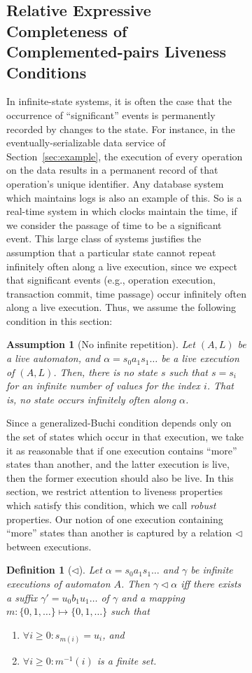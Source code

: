 \documentclass[11pt]{article}
\newcommand{\bn}{\begin{enumerate}}
\newcommand{\en}{\end{enumerate}}
\newcommand{\bd}{\begin{definition}}
\newcommand{\ed}{\end{definition}}
\newcommand{\fa}{\forall}
\newcommand{\al}{\alpha}
\newcommand{\ga}{\gamma}
\newcommand{\subs}{\lhd}		\newcommand{\suc}{\mathit{succ}}	\newcommand{\topp}{\mathit{top}}\newcommand{\trace}{\mathit{trace}}
\newtheorem{definition}{Definition}
\newtheorem{assumption}{Assumption}
\begin{document}
\begin{figure}[htb]
\begin{figure}[htb]
\subsection{Relative Expressive Completeness of Complemented-pairs
  Liveness Conditions}
\label{sec:completeness}


In infinite-state systems, it is often the case that the occurrence of
``significant'' events is permanently recorded by changes to the state.
For instance, in the eventually-serializable data service of
Section~\ref{sec:example}, the execution of every operation on the
data results
in a permanent record of that operation's unique identifier. 
Any database system which maintains logs is also an example of this.
So is a real-time system in which clocks maintain the time,
if we consider the passage of time to be a
significant event.
This large class of systems justifies the assumption that a particular
state cannot repeat infinitely often along a live execution, since we
expect that significant events (e.g., operation execution, transaction
commit, time passage) occur infinitely often along a live execution.
Thus, we assume the following condition in this section:

\begin{assumption}[No infinite repetition]
\label{ass:no-infinite-repetition}
Let $(A,L)$ be a live automaton, and
$\al = s_0 a_1 s_1 \ldots$ be a live execution of $(A,L)$. Then, there
is no state $s$ such that $s = s_i$ for an infinite number of values
for the index $i$.  
That is, no state occurs infinitely often along $\al$.
\end{assumption}
 

Since a generalized-Buchi condition depends only on the set of states
which occur in that execution, we take it as reasonable that if one
execution contains ``more'' states than another, and the latter
execution is live, then the former execution should also be live. 
In this section, we restrict attention to liveness properties which
satisfy this condition, which we call \emph{robust} properties.
Our notion of one execution containing ``more'' states than another 
is captured by a relation $\subs$ between executions.

\bd[$\subs$]
\label{def:subsumption}
Let $\al = s_0 a_1 s_1 \ldots$ and $\ga$ be infinite executions of automaton $A$.
Then $\ga \subs \al$ iff there exists a suffix $\ga' = u_0 b_1 u_1 \ldots$ of $\ga$ 
and a mapping $m: \{0,1,\ldots\} \mapsto \{0,1,\ldots\}$ such that 
\bn
\item $\fa i \ge 0: s_{m(i)} = u_i$, and 
\item $\fa i \ge 0: m^{-1}(i)$ is a finite set.
\en
\ed


\end{figure}
\end{figure}
\end{document}
